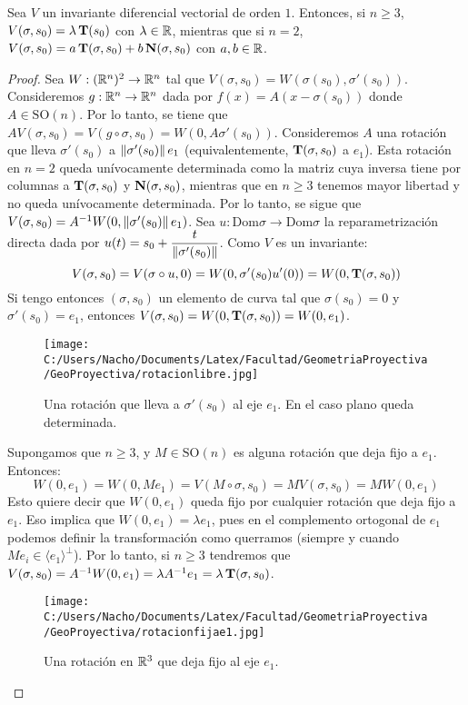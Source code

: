 \begin{prop}
Sea $V$ un invariante diferencial vectorial de orden $1$. Entonces, si $n\geq 3$, $V(\sigma,s_0) = \lambda\operatorname{\mathbf{T}}(s_0)$ con $\lambda\in\mathbb{R}$, mientras que si $n=2$, $V(\sigma,s_0)=a\operatorname{\mathbf{T}}(\sigma,s_0)+b\operatorname{\mathbf{N}}(\sigma,s_0)$ con $a,b\in\mathbb{R}$.
\begin{proof}
Sea $W:(\mathbb{R}^n)^2\to\mathbb{R}^n$ tal que $V(\sigma,s_0)=W(\sigma(s_0),\sigma'(s_0))$. Consideremos $g:\mathbb{R}^n\to\mathbb{R}^n$ dada por $f(x)=A(x-\sigma(s_0))$ donde $A\in\mathrm{SO}(n)$. Por lo tanto, se tiene que $AV(\sigma,s_0)=V(g\circ\sigma,s_0) =W(0,A\sigma'(s_0))$. Consideremos $A$ una rotación que lleva $\sigma'(s_0)$ a $\left\| \sigma'(s_0) \right\|e_1$ (equivalentemente, $\operatorname{\mathbf{T}}(\sigma,s_0)$ a $e_1$). Esta rotación en $n=2$ queda unívocamente determinada como la matriz cuya inversa tiene por columnas a $\operatorname{\mathbf{T}}(\sigma,s_0)$ y $\operatorname{\mathbf{N}}(\sigma,s_0)$, mientras que en $n\geq 3$ tenemos mayor libertad y no queda unívocamente determinada. 
Por lo tanto, se sigue que $V(\sigma,s_0) = A^{-1}W(0,\left\| \sigma'(s_0) \right\|e_1)$. Sea $u:\mathrm{Dom}\sigma\to\mathrm{Dom}\sigma$ la reparametrización directa dada por $u(t)=s_0+\dfrac{t}{\left\| \sigma'(s_0) \right\|}$. Como $V$ es un invariante: $$V(\sigma,s_0)=V(\sigma\circ u,0)=W(0,\sigma'(s_0)u'(0)) = W(0,\operatorname{\mathbf{T}}(\sigma,s_0))$$ Si tengo entonces $(\sigma,s_0)$ un elemento de curva tal que $\sigma(s_0)=0$ y $\sigma'(s_0)=e_1$, entonces $V(\sigma,s_0)=W(0,\operatorname{\mathbf{T}}(\sigma,s_0)) = W(0,e_1)$. 

\begin{figure}[h]
	\centering
		\texttt{[image: C:/Users/Nacho/Documents/Latex/Facultad/GeometriaProyectiva/GeoProyectiva/rotacionlibre.jpg]}
	\caption{Una rotación que lleva a $\sigma'(s_0)$ al eje $e_1$. En el caso plano queda determinada.}
	\label{fig:rotacionlibre}
\end{figure}

Supongamos que $n\geq 3$, y $M\in\mathrm{SO}(n)$ es alguna rotación que deja fijo a $e_1$. Entonces: $$W(0,e_1)=W(0,Me_1)=V(M\circ\sigma,s_0)=MV(\sigma,s_0)=MW(0,e_1)$$ Esto quiere decir que $W(0,e_1)$ queda fijo por cualquier rotación que deja fijo a $e_1$. Eso implica que $W(0,e_1)=\lambda e_1$, pues en el complemento ortogonal de $e_1$ podemos definir la transformación como querramos (siempre y cuando $Me_i\in\langle e_1\rangle^{\perp}$). Por lo tanto, si $n\geq 3$ tendremos que $V(\sigma,s_0)=A^{-1}W(0,e_1)=\lambda A^{-1}e_1 = \lambda \operatorname{\mathbf{T}}(\sigma,s_0)$. 

\begin{figure}[h]
	\centering
		\texttt{[image: C:/Users/Nacho/Documents/Latex/Facultad/GeometriaProyectiva/GeoProyectiva/rotacionfijae1.jpg]}
	\caption{Una rotación en $\mathbb{R}^3$ que deja fijo al eje $e_1$.}
	\label{fig:rotacionfijae1}
\end{figure}


\end{proof}
\end{prop}
